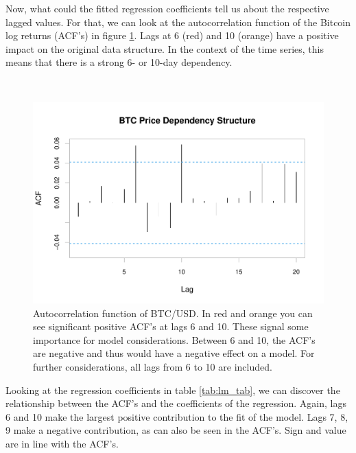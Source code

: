 \documentclass[
]{article}
\begin{document}
Now, what could the fitted regression coefficients tell us about the
respective lagged values. For that, we can look at the autocorrelation
function of the Bitcoin log returns (ACF's) in figure \ref{fig:xai_acf}.
Lags at 6 (red) and 10 (orange) have a positive impact on the original
data structure. In the context of the time series, this means that there
is a strong 6- or 10-day dependency.

~

\begin{figure}

{\centering \includegraphics[width=0.75\linewidth]{00_main_files/figure-latex/xai_acf-1} 

}

\caption{Autocorrelation function of BTC/USD. In red and orange you can see significant positive ACF's at lags 6 and 10. These signal some importance for model considerations. Between 6 and 10, the ACF's are negative and thus would have a negative effect on a model. For further considerations, all lags from 6 to 10 are included.}\label{fig:xai_acf}
\end{figure}

\newpage

Looking at the regression coefficients in table \ref{tab:lm_tab}, we can
discover the relationship between the ACF's and the coefficients of the
regression. Again, lags 6 and 10 make the largest positive contribution
to the fit of the model. Lags 7, 8, 9 make a negative contribution, as
can also be seen in the ACF's. Sign and value are in line with the
ACF's.
\end{document}
